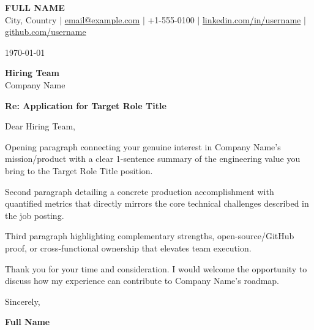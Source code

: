 \documentclass[10.5pt,a4paper]{article}
\begin{document}
{\LARGE \textbf{FULL NAME}} \\[3pt]
City, Country $|$
\href{mailto:email@example.com}{email@example.com} $|$
+1-555-0100 $|$
\href{https://linkedin.com/in/username}{linkedin.com/in/username} $|$
\href{https://github.com/username}{github.com/username}

\vspace{8pt}
\today

\textbf{Hiring Team} \\
Company Name

\textbf{Re: Application for Target Role Title}

Dear Hiring Team,

Opening paragraph connecting your genuine interest in Company Name's mission/product with a clear 1-sentence summary of the engineering value you bring to the Target Role Title position.

Second paragraph detailing a concrete production accomplishment with quantified metrics that directly mirrors the core technical challenges described in the job posting.

Third paragraph highlighting complementary strengths, open-source/GitHub proof, or cross-functional ownership that elevates team execution.

Thank you for your time and consideration. I would welcome the opportunity to discuss how my experience can contribute to Company Name's roadmap.

Sincerely,

\vspace{10pt}
\textbf{Full Name}
\end{document}
